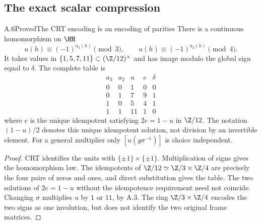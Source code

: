 \subsection{The exact scalar compression}

\begin{statement}{A.6}{Proved}{The CRT encoding is an encoding of parities}
There is a continuous homomorphism on $\HH$
\[
 u(h)\equiv(-1)^{a_3(h)}\pmod3,\qquad
 u(h)\equiv(-1)^{a_2(h)}\pmod4.
\]
It takes values in $\{1,5,7,11\}\subset(\Z/12)^\times$ and
has image modulo the global sign equal to $\delta$.
The complete table is
\[
\begin{array}{cc|ccc}
a_3&a_2&u&e&\delta\\\hline
0&0&1&0&0\\0&1&7&9&1\\1&0&5&4&1\\1&1&11&1&0
\end{array}
\]
where $e$ is the unique idempotent satisfying $2e=1-u$ in $\Z/12$.
The notation $(1-u)/2$ denotes this unique idempotent solution,
not division by an invertible element. For a general multiplier
only $[u(g\sigma^{-1})]$ is choice independent.
\end{statement}
\begin{proof}
CRT identifies the units with $\{\pm1\}\times\{\pm1\}$.
Multiplication of signs gives the homomorphism law. The idempotents
of $\Z/12\simeq\Z/3\times\Z/4$ are precisely the four pairs of
zeros and ones, and direct substitution gives the table. The two
solutions of $2e=1-u$ without the idempotence requirement need not
coincide. Changing $\sigma$ multiplies $u$ by $1$ or $11$, by
A.3. The ring $\Z/3\times\Z/4$ encodes the two signs as one
involution, but does not identify the two original frame matrices.
\end{proof}

